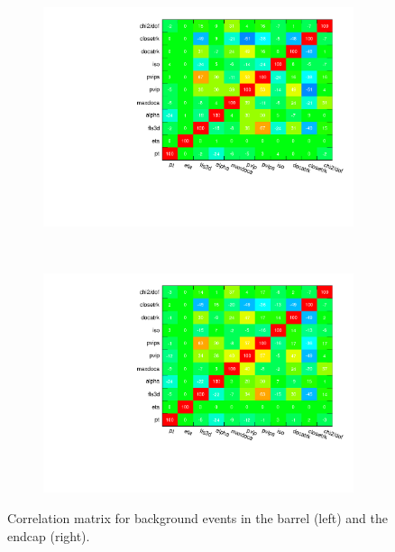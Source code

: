 \documentclass[10pt,a4paper]{article}
\begin{document}
\begin{figure}
		\centering
        \begin{subfigure}[b]{0.45\textwidth}
				\includegraphics[width=\textwidth]{Figures/correlationMatrixB_barrel}
				\label{fig:matrixBBarrel}
        \end{subfigure}
        ~
        \begin{subfigure}[b]{0.45\textwidth}
				\includegraphics[width=\textwidth]{Figures/correlationMatrixB_endcaps}
				\label{fig:matrixBEndcaps}
        \end{subfigure}
        \caption{Correlation matrix for background events in the barrel (left) and the endcap (right).}
        \label{fig:correlationMatricesBackground}
\end{figure}





\end{document}
